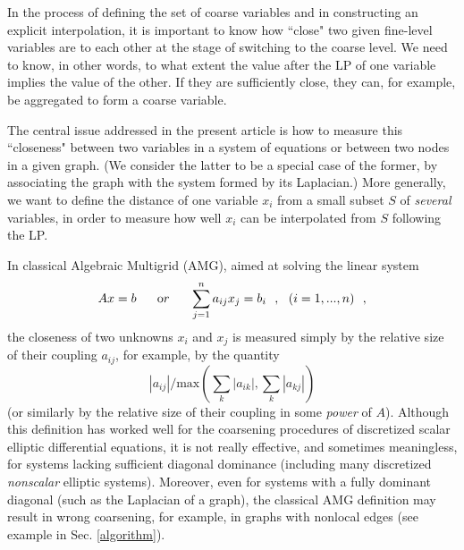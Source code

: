 \documentclass[final]{siamltex}
\begin{document}
In the process of defining the set of coarse variables and
in constructing an explicit interpolation, it is important to know
how ``close"  two given fine-level variables are to each other at
the stage of switching to the coarse level. We need to know, in other words, to what extent
the value after the LP of one variable implies the value of the other.
If they are sufficiently close, they can, for example, be
aggregated to form a coarse variable.

The central issue addressed in the present article is how to
measure this ``closeness" between two variables in a system of
equations or between two nodes in a given graph. (We consider the
latter to be a special case of the former, by associating the
graph with the system formed by its Laplacian.) More generally, we
want to define the distance of one variable $x_i$ from a small subset
$S$ of {\it several} variables, in order to measure how well $x_i$
can be interpolated from $S$ following the LP.

In classical Algebraic Multigrid (AMG), aimed at solving the
linear system
\begin{equation}\label{AMG1}
Ax = b~~~~~ {\text or}~~~~~ \sum_{j=1}^n a_{ij} x_j = b_i ~~,~~
(i= 1, ... ,n)~~,
\end{equation}
the closeness of two unknowns $x_i$ and $x_j$ is measured simply
by the relative size of their coupling $a_{ij}$, for example, by the quantity
\begin{equation}\label{AMG2}
|a_{ij}| / {\text {max}}(\sum_k |a_{ik}| , \sum_k |a_{kj}|)
\end{equation}
(or similarly by the relative size of their coupling in some {\it
power} of $A$). Although this definition has worked well for
the coarsening procedures of discretized scalar elliptic
differential equations, it is not really effective, and sometimes
meaningless, for systems lacking sufficient diagonal
dominance (including many discretized {\it nonscalar} elliptic
systems). Moreover, even for systems with a fully dominant diagonal
(such as the Laplacian of a graph), the classical AMG definition
may result in wrong coarsening, for example, in graphs
with nonlocal edges (see example in Sec. \ref{algorithm}).
\end{document}
